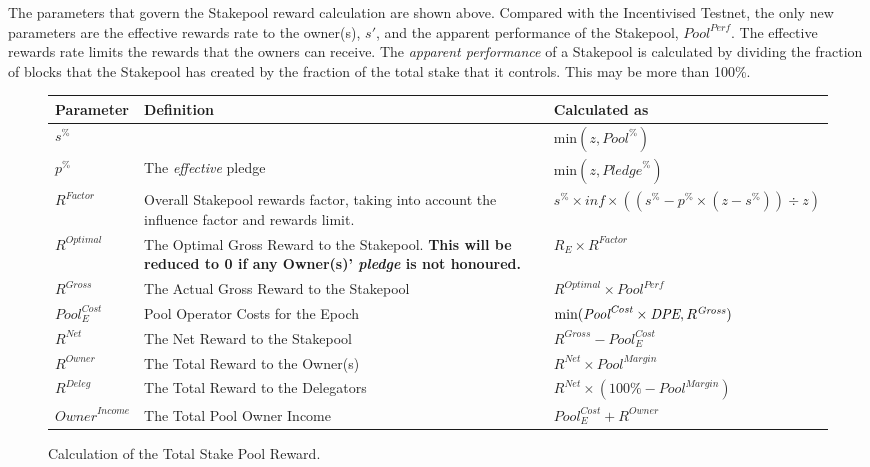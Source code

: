 \documentclass[11pt,a4paper,dvipsnames,twosided,final]{article}
\begin{document}
\noindent
The parameters that govern the Stakepool reward calculation are shown above.  Compared with the Incentivised
Testnet, the only new parameters are the effective rewards rate to the owner(s), $s'$, and the apparent performance of the Stakepool, $\textit{Pool}^{\textit{Perf}}$.
The effective rewards rate limits the rewards that the owners can receive.  The \emph{apparent performance} of a Stakepool is calculated
by dividing the fraction of blocks that the Stakepool has created by the fraction of the total stake that it controls.  This may be more than 100\%.

\begin{figure}[h!]
\begin{center}
\begin{tabular}{||l|p{6cm}|l||}
  \hline \hline
  \textbf{Parameter}  & \textbf{Definition} & \textbf{Calculated as} \\\hline
  $s^\%$ &  & $\textrm{min} (z,{\textit{Pool}}^\%)$ \\\hline
  $p^\%$ & The \emph{effective} pledge  & $\textrm{min} (z,{\textit{Pledge}}^\%) $ \\\hline
  $\textit{R}^\textit{Factor}$ & Overall Stakepool rewards factor, taking into account the influence factor and rewards limit. & $s^\% \times \textit{inf} \times ((s^\% - p^\% \times (z - s^\%)) \div z)$ \\\hline
  $R^{Optimal}$ & The Optimal Gross Reward to the Stakepool.  \textbf{This will be reduced to 0 if any Owner(s)' \emph{pledge} is not honoured.} & $R_E \times \textit{R}^{Factor}$ \\\hline
$R^{\textit{Gross}}$ & The Actual Gross Reward to the Stakepool & $R^{Optimal} \times \textit{Pool}^{\textit{Perf}}$ \\\hline
${\textit{Pool}}^{\textit{Cost}}_E$ & Pool Operator Costs for the Epoch & $\textrm{min}(\textit{\textit{Pool}}^{\textit{Cost}} \times \textit{DPE},R^{\textit{Gross}})$ \\\hline
$R^{\textit{Net}}$  & The Net Reward to the Stakepool & $R^{\textit{Gross}} - {\textit{Pool}}^{\textit{Cost}}_E$ \\\hline
$R^{\textit{Owner}}$ & The Total Reward to the Owner(s) & $R^{\textit{Net}} \times {\textit{Pool}}^{\textit{Margin}} $ \\\hline
$R^{\textit{Deleg}}$ & The Total Reward to the Delegators & $R^{\textit{Net}} \times (100\% - {\textit{Pool}}^{\textit{Margin}})$ \\\hline
$\textit{Owner}^\textit{Income}$ & The Total Pool Owner Income & ${\textit{Pool}}^{\textit{Cost}}_E + R^{Owner}$ \\\hline
\hline
\end{tabular}
\end{center}
\caption{Calculation of the Total Stake Pool Reward.}
\end{figure}
\end{document}
